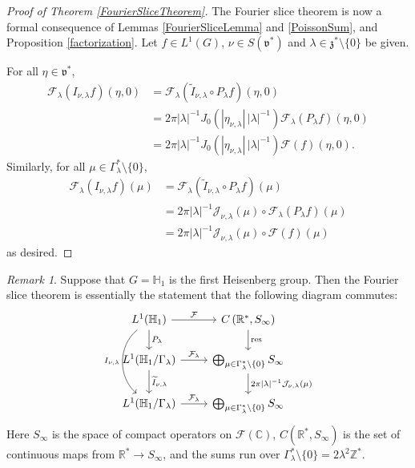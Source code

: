 \documentclass[11pt]{amsart}
\theoremstyle{plain}
\theoremstyle{definition}
\theoremstyle{remark}
\newtheorem{remark}[theorem]{Remark}
\numberwithin{equation}{section}
\def\fz{\mathfrak{z}}
\def\fv{\mathfrak{v}}
\def\cJ{\mathcal{J}}
\def\cF{\mathcal{F}}
\def\mz{\setminus\{0\}}
\def\R{{\mathbb R}}%
\def\C{{\mathbb C}}%
\def\Z{{\mathbb Z}}%
\def \heis {\mathbb{H}}
\numberwithin{equation}{section}
\begin{document}
\begin{proof}[Proof of Theorem \ref{FourierSliceTheorem}]
	The Fourier slice theorem is now a formal consequence of Lemmas \ref{FourierSliceLemma} and \ref{PoissonSum}, and Proposition \ref{factorization}.  Let $f\in L^1(G)$, $\nu\in S(\fv^*)$ and $\lambda\in \fz^*\mz$ be given. 
	
	For all $\eta\in \fv^*$, 
	\begin{align*}
		\cF_\lambda(I_{\nu, \lambda}f)(\eta, 0)
		&=\cF_\lambda(\widetilde{I}_{\nu, \lambda}\circ P_\lambda f)(\eta, 0)\\
		&=2\pi|\lambda|^{-1}J_0(|\eta_{\nu, \lambda}|\,|\lambda|^{-1})\cF_\lambda(P_\lambda f)(\eta, 0)\\
		&=2\pi|\lambda|^{-1}J_0(|\eta_{\nu, \lambda}|\,|\lambda|^{-1})\cF( f)(\eta, 0).
	\end{align*}
	 Similarly, for all $\mu\in \Gamma_\lambda^*\mz$, 
	\begin{align*}
		\cF_{\lambda}(I_{\nu, \lambda}f)(\mu)
		&=\cF_\lambda(\widetilde{I}_{\nu, \lambda}\circ P_\lambda f)(\mu)\\
		&=2\pi|\lambda|^{-1}\cJ_{\nu, \lambda}(\mu)\circ \cF_\lambda(P_\lambda f)(\mu)\\
		&=2\pi|\lambda|^{-1}\cJ_{\nu, \lambda}(\mu)\circ \cF( f)(\mu)
	\end{align*}
as desired.
\end{proof}

\begin{remark}\label{commutative}
	Suppose that $G=\heis_1$ is the first Heisenberg group. Then the Fourier slice theorem is essentially the statement that the following diagram commutes:
	\[ 
	\begin{tikzcd}
		L^1(\heis_1) \arrow[dd, bend right=50, "I_{\nu, \lambda}"']\arrow[d, "P_\lambda"]  \arrow[r, "\mathcal{F}"]  &C\left(\mathbb{R}^*, S_\infty\right)\arrow[d, "\text{res}"]\\
		L^1(\heis_1/\Gamma_\lambda)  \arrow[r, "\mathcal{F}_{\lambda}"] \arrow[d, "\widetilde{I}_{\nu, \lambda}"]& \bigoplus_{\mu\in\Gamma_\lambda^*\mz}S_\infty\arrow[d, "2\pi|\lambda|^{-1}\mathcal{J}_{\nu, \lambda}(\mu)"]\\
		L^1(\heis_1/\Gamma_\lambda) \arrow[r, "\mathcal{F}_{\lambda}"] & \bigoplus_{\mu\in\Gamma_\lambda^*\mz}S_\infty
	\end{tikzcd}
	\]
	Here $S_\infty$ is the space of compact operators on $\cF(\C)$, $C(\R^*, S_\infty)$ is the set of continuous maps from $\R^*\to S_\infty$, and the sums run over $\Gamma_\lambda^*\mz=2\lambda^2\Z^*$.
\end{remark}
\end{document}
